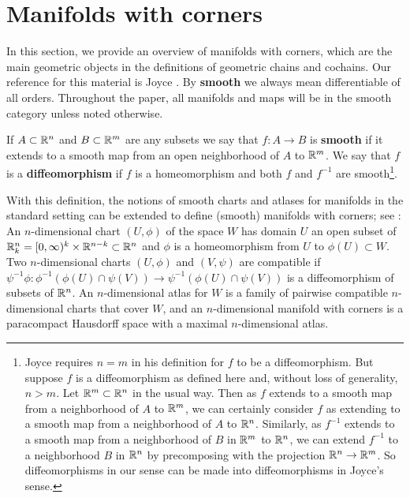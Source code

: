 
\section{Manifolds with corners}\label{S: manifolds with corners}

In this section, we provide an overview of manifolds with corners, which are the main geometric objects in the definitions of geometric chains and cochains.
Our reference for this material is Joyce \cite{Joy12}.
By \textbf{smooth} we always mean differentiable of all orders.
Throughout the paper, all manifolds and maps will be in the smooth category unless noted otherwise.

\begin{definition}
	If $A \subset \mathbb{R}^n$ and $B \subset \mathbb{R}^m$ are any subsets we say that $f \colon A \to B$ is \textbf{smooth} if it extends to a smooth map from an open neighborhood of $A$ to $\mathbb{R}^m$.
	We say that $f$ is a \textbf{diffeomorphism} if $f$ is a homeomorphism and both $f$ and $f^{-1}$ are smooth\footnote{Joyce requires $n = m$ in his definition for $f$ to be a diffeomorphism.
	But suppose $f$ is a diffeomorphism as defined here and, without loss of generality, $n>m$.
	Let $\mathbb{R}^m \subset \mathbb{R}^n$ in the usual way.
	Then as $f$ extends to a smooth map from a neighborhood of $A$ to $\mathbb{R}^m$, we can certainly consider $f$ as extending to a smooth map from a neighborhood of $A$ to $\mathbb{R}^n$.
	Similarly, as $f^{-1}$ extends to a smooth map from a neighborhood of $B$ in $\mathbb{R}^m$ to $\mathbb{R}^n$, we can extend $f^{-1}$ to a neighborhood $B$ in $\mathbb{R}^n$ by precomposing with the projection $\mathbb{R}^n \to \mathbb{R}^m$.
	So diffeomorphisms in our sense can be made into diffeomorphisms in Joyce's sense.}.
\end{definition}

With this definition, the notions of smooth charts and atlases for manifolds in the standard setting can be extended to define (smooth) manifolds with corners; see \cite[Section 2]{Joy12}: An $n$-dimensional chart $(U,\phi)$ of the space $W$ has domain $U$ an open subset of $\mathbb{R}^n_k = [0,\infty)^k \times \mathbb{R}^{n-k} \subset \mathbb{R}^n$ and $\phi$ is a homeomorphism from $U$ to $\phi(U) \subset W$.
Two $n$-dimensional charts $(U,\phi)$ and $(V,\psi)$ are compatible if $\psi^{-1}\phi \colon \phi^{-1}(\phi(U) \cap \psi(V)) \to \psi^{-1}(\phi(U) \cap \psi(V))$ is a diffeomorphism of subsets of $\mathbb{R}^n$.
An $n$-dimensional atlas for $W$ is a family of pairwise compatible $n$-dimensional charts that cover $W$, and an $n$-dimensional manifold with corners is a paracompact Hausdorff space with a maximal $n$-dimensional atlas.

